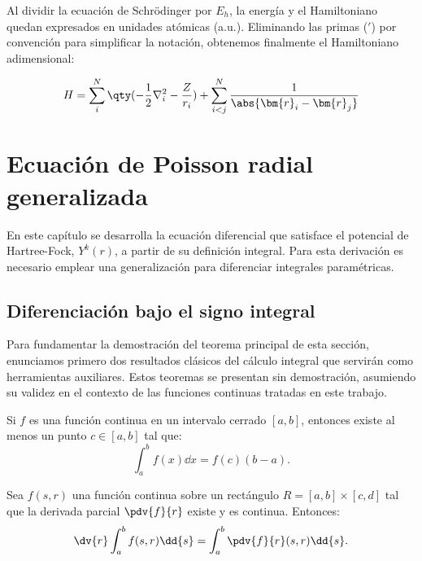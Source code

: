 Al dividir la ecuación de Schrödinger por $E_h$, la energía y el Hamiltoniano quedan expresados en unidades atómicas (a.u.). Eliminando las primas ($'$) por convención para simplificar la notación, obtenemos finalmente el Hamiltoniano adimensional:

\begin{equation}
  \label{eq:hamiltonian1}
  H = \sum_i^N \qty(- \frac{1}{2}\nabla_i^2 - \frac{Z}{r_i}) + \sum_{i<j}^N \frac{1}{\abs{\bm{r}_i-\bm{r}_j}}
\end{equation}

\chapter{Ecuación de Poisson radial generalizada}
\label{apendice:poisson}

En este capítulo se desarrolla la ecuación diferencial que satisface el potencial de Hartree-Fock, \( Y^k(r) \), a partir de su definición integral. Para esta derivación es necesario emplear una generalización para diferenciar integrales paramétricas.

\section{Diferenciación bajo el signo integral}

Para fundamentar la demostración del teorema principal de esta sección, enunciamos primero dos resultados clásicos del cálculo integral que servirán como herramientas auxiliares. Estos teoremas se presentan sin demostración, asumiendo su validez en el contexto de las funciones continuas tratadas en este trabajo.

\begin{theorem}\label{thm:valor-medio}
  Si \( f \) es una función continua en un intervalo cerrado \( [a,b] \), entonces existe al menos un punto \( c \in [a,b] \) tal que:
  \[
  \int_{a}^{b} f(x) \dd{x} = f(c)(b-a).
  \]
\end{theorem}

\begin{theorem}\label{thm:leibniz-constante}
  Sea \( f(s,r) \) una función continua sobre un rectángulo \( R = [a,b] \times [c,d] \) tal que la derivada parcial \( \pdv{f}{r} \) existe y es continua. Entonces:
  \[
  \dv{r} \int_{a}^{b} f(s,r) \dd{s} = \int_{a}^{b} \pdv{f}{r}(s,r) \dd{s}.
  \]
\end{theorem}

